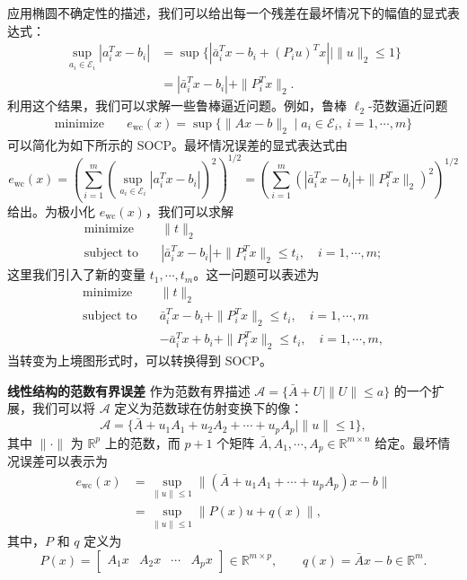 \documentclass[UTF8, 12pt, fontset=fandol, oneside]{ctexart}
\begin{document}
应用椭圆不确定性的描述，我们可以给出每一个残差在最坏情况下的幅值的显式表达式：
\[
\begin{aligned}
\sup_{a_i\in\mathcal{E}_i}|a_i^Tx-b_i|
&=\sup\{|\bar{a}_i^Tx-b_i+(P_iu)^Tx|\mid \|u\|_2\leq 1\}\\
&=|\bar{a}_i^Tx-b_i|+\|P_i^Tx\|_2.
\end{aligned}
\]
利用这个结果，我们可以求解一些鲁棒逼近问题。例如，鲁棒 $\ell_2$-范数逼近问题
\[
\begin{aligned}
\text{minimize}\quad & e_{\mathrm{wc}}(x)=\sup\{\|Ax-b\|_2\mid a_i\in\mathcal{E}_i,\ i=1,\cdots,m\}
\end{aligned}
\]
可以简化为如下所示的 SOCP。最坏情况误差的显式表达式由
\[
e_{\mathrm{wc}}(x)=
\left(\sum_{i=1}^m\left(\sup_{a_i\in\mathcal{E}_i}|a_i^Tx-b_i|\right)^2\right)^{1/2}
=
\left(\sum_{i=1}^m\left(|\bar{a}_i^Tx-b_i|+\|P_i^Tx\|_2\right)^2\right)^{1/2}
\]
给出。为极小化 $e_{\mathrm{wc}}(x)$，我们可以求解
\[
\begin{aligned}
\text{minimize}\quad & \|t\|_2\\
\text{subject to}\quad & |\bar{a}_i^Tx-b_i|+\|P_i^Tx\|_2\leq t_i,\quad i=1,\cdots,m;
\end{aligned}
\]
这里我们引入了新的变量 $t_1,\cdots,t_m$。这一问题可以表述为
\[
\begin{aligned}
\text{minimize}\quad & \|t\|_2\\
\text{subject to}\quad & \bar{a}_i^Tx-b_i+\|P_i^Tx\|_2\leq t_i,\quad i=1,\cdots,m\\
& -\bar{a}_i^Tx+b_i+\|P_i^Tx\|_2\leq t_i,\quad i=1,\cdots,m,
\end{aligned}
\]
当转变为上境图形式时，可以转换得到 SOCP。

\noindent\textbf{线性结构的范数有界误差}\quad
作为范数有界描述 $\mathcal{A}=\{\bar{A}+U\mid \|U\|\leq a\}$ 的一个扩展，我们可以将 $\mathcal{A}$ 定义为范数球在仿射变换下的像：
\[
\mathcal{A}=\{\bar{A}+u_1A_1+u_2A_2+\cdots+u_pA_p\mid \|u\|\leq 1\},
\]
其中 $\|\cdot\|$ 为 $\mathbb{R}^p$ 上的范数，而 $p+1$ 个矩阵 $\bar{A},A_1,\cdots,A_p\in\mathbb{R}^{m\times n}$ 给定。最坏情况误差可以表示为
\[
\begin{aligned}
e_{\mathrm{wc}}(x)
&=\sup_{\|u\|\leq 1}\|(\bar{A}+u_1A_1+\cdots+u_pA_p)x-b\|\\
&=\sup_{\|u\|\leq 1}\|P(x)u+q(x)\|,
\end{aligned}
\]
其中，$P$ 和 $q$ 定义为
\[
P(x)=
\begin{bmatrix}
A_1x & A_2x & \cdots & A_px
\end{bmatrix}\in\mathbb{R}^{m\times p},
\qquad q(x)=\bar{A}x-b\in\mathbb{R}^m.
\]
\end{document}
